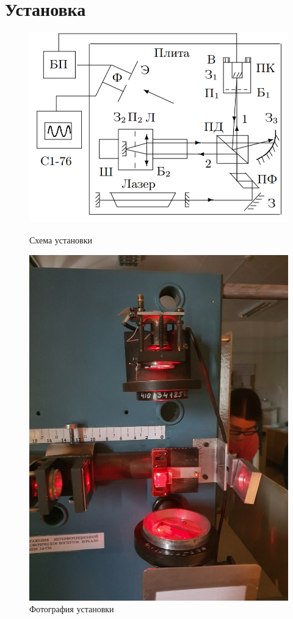 \documentclass[a4paper,12pt]{article}
\begin{document}
\section*{Установка}
\begin{figure}[H]
  \centering
  \begin{minipage}[b]{0.45\textwidth}
    \includegraphics[width=\textwidth]{2.png}
    \caption{Схема установки}
  \end{minipage}
  \hfill
  \begin{minipage}[b]{0.45\textwidth}
    \includegraphics[width=\textwidth]{e1.jpg}
    \caption{Фотография установки}
  \end{minipage}
\end{figure}
\end{document}
